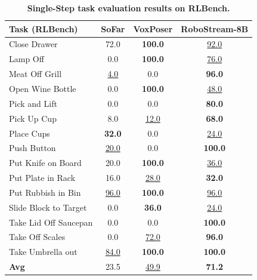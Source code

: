 \begin{table}[htbp]
    \centering
    \caption{\textbf{Single-Step task evaluation results on RLBench.}}
    \label{tab:rlbench_results_table}
    
    \begin{tabular*}{\textwidth}{@{\extracolsep{\fill}} l | ccc @{}}
        \toprule
        \textbf{Task (RLBench)} & \textbf{SoFar} & \textbf{VoxPoser} & \textbf{RoboStream-8B} \\
        \midrule
        Close Drawer           & 72.0            & \textbf{100.0}   & \underline{92.0} \\
        Lamp Off               & 0.0             & \textbf{100.0}   & \underline{76.0} \\
        Meat Off Grill         & \underline{4.0} & 0.0              & \textbf{96.0} \\
        Open Wine Bottle       & 0.0             & \textbf{100.0}   & \underline{48.0} \\
        Pick and Lift          & 0.0             & 0.0              & \textbf{80.0} \\
        Pick Up Cup            & 8.0             & \underline{12.0} & \textbf{68.0} \\
        Place Cups             & \textbf{32.0}   & 0.0              & \underline{24.0} \\
        Push Button            & \underline{20.0} & 0.0              & \textbf{100.0} \\
        Put Knife on Board     & 20.0            & \textbf{100.0}   & \underline{36.0} \\
        Put Plate in Rack      & 16.0            & \underline{28.0} & \textbf{32.0} \\
        Put Rubbish in Bin     & \underline{96.0} & \textbf{100.0}   & \underline{96.0} \\
        Slide Block to Target  & 0.0             & \textbf{36.0}    & \underline{24.0} \\
        Take Lid Off Saucepan  & 0.0             & 0.0              & \textbf{100.0} \\
        Take Off Scales        & 0.0             & \underline{72.0} & \textbf{96.0} \\
        Take Umbrella out      & \underline{84.0} & \textbf{100.0}   & \textbf{100.0} \\
        \midrule
        \textbf{Avg}           & 23.5            & \underline{49.9} & \textbf{71.2} \\
        \bottomrule
    \end{tabular*}
\end{table}